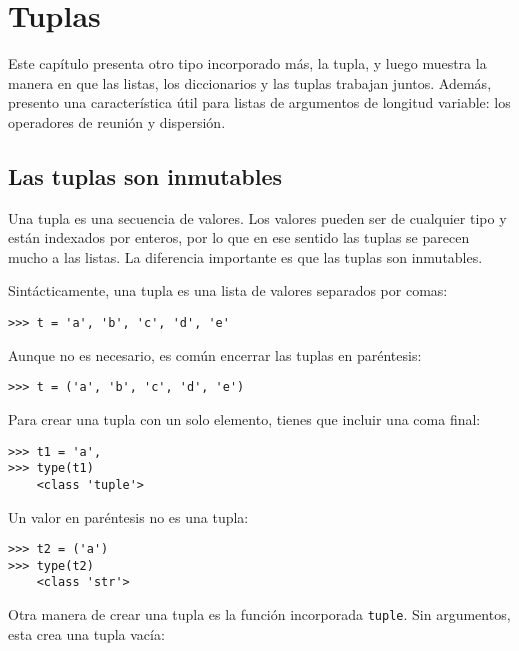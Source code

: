 \documentclass[10pt]{book}
\begin{document}
\chapter{Tuplas}
\label{tuplechap}

Este capítulo presenta otro tipo incorporado más, la tupla, y luego
muestra la manera en que las listas, los diccionarios y las tuplas trabajan juntos.
Además, presento una característica útil para listas de argumentos de longitud variable:
los operadores de reunión y dispersión.



\section{Las tuplas son inmutables}

Una tupla es una secuencia de valores.  Los valores pueden ser de cualquier tipo y 
están indexados por enteros, por lo que en ese sentido las tuplas se parecen mucho
a las listas.  La diferencia importante es que las tuplas son inmutables.

Sintácticamente, una tupla es una lista de valores separados por comas:

\begin{verbatim}
>>> t = 'a', 'b', 'c', 'd', 'e'
\end{verbatim}
%
Aunque no es necesario, es común encerrar las tuplas en
paréntesis:

\begin{verbatim}
>>> t = ('a', 'b', 'c', 'd', 'e')
\end{verbatim}
%
Para crear una tupla con un solo elemento, tienes que incluir una coma
final:

\begin{verbatim}
>>> t1 = 'a',
>>> type(t1)
    <class 'tuple'>
\end{verbatim}
%
Un valor en paréntesis no es una tupla:

\begin{verbatim}
>>> t2 = ('a')
>>> type(t2)
    <class 'str'>
\end{verbatim}
%
Otra manera de crear una tupla es la función incorporada {\tt tuple}.
Sin argumentos, esta crea una tupla vacía:
\end{document}
